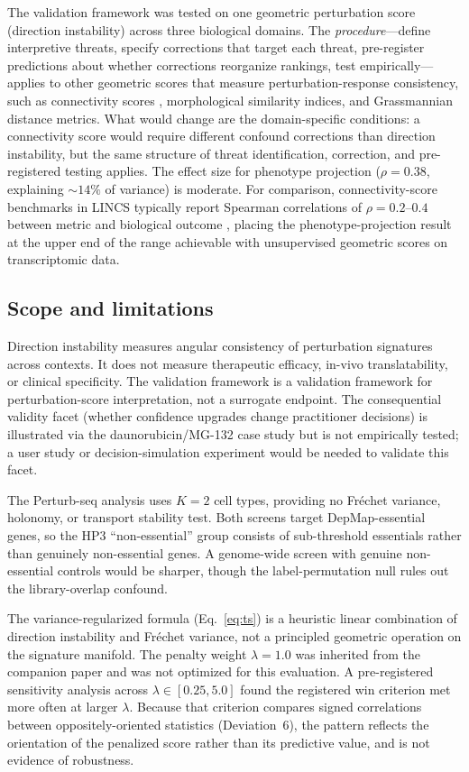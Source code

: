 \documentclass[11pt]{article}
\begin{document}
The validation framework was tested on one geometric perturbation score
(direction instability) across three biological domains. The
\emph{procedure}---define interpretive threats, specify corrections
that target each threat, pre-register predictions about whether
corrections reorganize rankings, test empirically---applies to other
geometric scores that measure perturbation-response consistency, such as
connectivity scores \citep{subramanian2017next}, morphological similarity
indices, and Grassmannian distance metrics. What would change are the
domain-specific conditions: a connectivity score would require different
confound corrections than direction instability, but the same
structure of threat identification, correction, and pre-registered
testing applies. The effect size for phenotype projection ($\rho = 0.38$,
explaining ${\sim}14\%$ of variance) is moderate. For comparison,
connectivity-score benchmarks in LINCS typically report Spearman
correlations of $\rho = 0.2$--$0.4$ between metric and biological
outcome \citep{li2020comprehensive}, placing the phenotype-projection
result at the upper end of the range achievable with unsupervised
geometric scores on transcriptomic data.

\subsection{Scope and limitations}
\label{sec:limitations}

Direction instability measures angular consistency of perturbation signatures
across contexts. It does not measure therapeutic efficacy, in-vivo
translatability, or clinical specificity. The validation framework is a
validation framework for perturbation-score interpretation, not a surrogate
endpoint. The consequential validity facet (whether confidence upgrades
change practitioner decisions) is illustrated via the daunorubicin/MG-132
case study but is not empirically tested; a user study or
decision-simulation experiment would be needed to validate this facet.

The Perturb-seq analysis uses $K = 2$ cell types, providing no Fr\'echet
variance, holonomy, or transport stability test. Both screens target
DepMap-essential genes, so the HP3 ``non-essential'' group consists of
sub-threshold essentials rather than genuinely non-essential genes. A
genome-wide screen with genuine non-essential controls would be sharper,
though the label-permutation null rules out the library-overlap confound.

The variance-regularized formula (Eq.~\ref{eq:ts}) is a heuristic
linear combination of direction instability and Fr\'echet variance, not a
principled geometric operation on the signature manifold. The penalty
weight $\lambda = 1.0$ was inherited from the companion paper
\citep{tower2026drug} and was not optimized for this evaluation. A pre-registered sensitivity
analysis across $\lambda \in [0.25, 5.0]$ found the registered win
criterion met more often at larger $\lambda$. Because that criterion
compares signed correlations between oppositely-oriented statistics
(Deviation~6), the pattern reflects the orientation of the penalized score
rather than its predictive value, and is not evidence of robustness.
\end{document}
